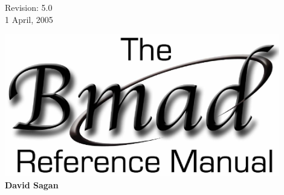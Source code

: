 \thispagestyle{empty}

\begin{flushright}
\large
  Revision: 5.0 \\
  1 April, 2005 \\
\end{flushright}

\vfill

{
\begin{center}
\includegraphics[width=12cm]{bmad_ref_manual.eps} \\
\vskip 0.3in
\huge\bf David Sagan
\end{center}
}

\vfill
\break